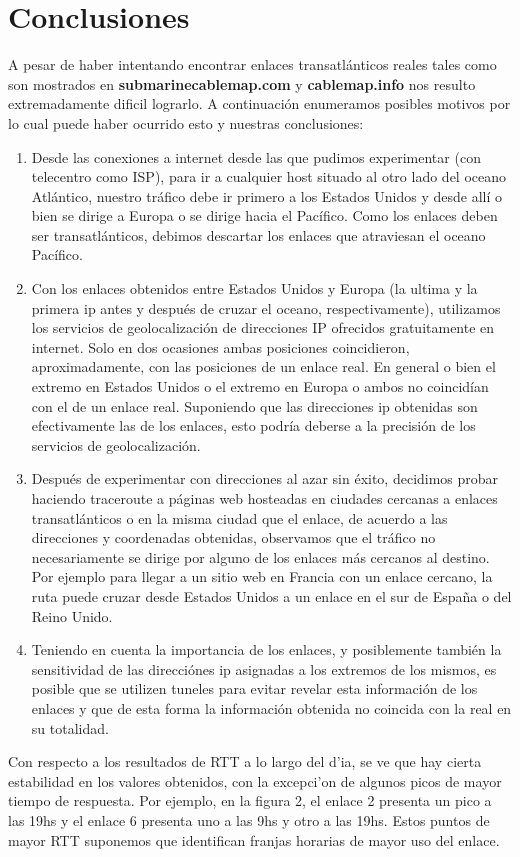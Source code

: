 \section{Conclusiones}


A pesar de haber intentando encontrar enlaces transatlánticos reales tales como son mostrados en \textbf{submarinecablemap.com} y \textbf{cablemap.info} nos resulto extremadamente dificil lograrlo. A continuación enumeramos posibles motivos por lo cual puede haber ocurrido esto y nuestras conclusiones:
\begin{enumerate}
\item	Desde las conexiones a internet desde las que pudimos experimentar (con telecentro como ISP), para ir a cualquier host situado al otro lado del oceano Atlántico, nuestro tráfico debe ir primero a los Estados Unidos y desde allí o bien se dirige a Europa o se dirige hacia el Pacífico. Como los enlaces deben ser transatlánticos, debimos descartar los enlaces que atraviesan el oceano Pacífico.
\item	Con los enlaces obtenidos entre Estados Unidos y Europa (la ultima y la primera ip antes y después de cruzar el oceano, respectivamente), utilizamos los servicios de geolocalización de direcciones IP ofrecidos gratuitamente en internet. Solo en dos ocasiones ambas posiciones coincidieron, aproximadamente, con las posiciones de un enlace real. En general o bien el extremo en Estados Unidos o el extremo en Europa o ambos no coincidían con el de un enlace real. Suponiendo que las direcciones ip obtenidas son efectivamente las de los enlaces, esto podría deberse a la precisión de los servicios de geolocalización.
\item	Después de experimentar con direcciones al azar sin éxito, decidimos probar haciendo traceroute a páginas web hosteadas en ciudades cercanas a enlaces transatlánticos o en la misma ciudad que el enlace, de acuerdo a las direcciones y coordenadas obtenidas, observamos que el tráfico no necesariamente se dirige por alguno de los enlaces más cercanos al destino. Por ejemplo para llegar a un sitio web en Francia con un enlace cercano, la ruta puede cruzar desde Estados Unidos a un enlace en el sur de España o del Reino Unido.
\item	Teniendo en cuenta la importancia de los enlaces, y posiblemente también la sensitividad de las direcciónes ip asignadas a los extremos de los mismos, es posible que se utilizen tuneles para evitar revelar esta información de los enlaces y que de esta forma la información obtenida no coincida con la real en su totalidad.
\end{enumerate}

Con respecto a los resultados de RTT a lo largo del d'ia, se ve que hay cierta estabilidad en los valores obtenidos, con la excepci'on de algunos 
picos de mayor tiempo de respuesta. Por ejemplo, en la figura 2, el enlace 2 presenta un pico a las 19hs y el enlace 6 presenta uno a las 9hs y otro a
las 19hs. Estos puntos de mayor RTT suponemos que identifican franjas horarias de mayor uso del enlace.
